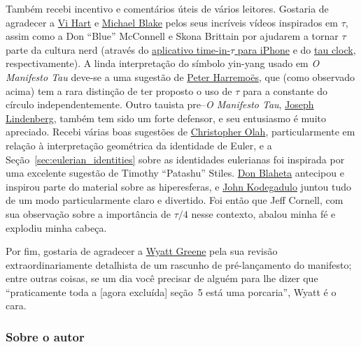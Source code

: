 Também recebi incentivo e comentários úteis de vários leitores. Gostaria de agradecer a \href{https://www.youtube.com/watch?v=jG7vhMMXagQ}{Vi Hart} e \href{https://www.youtube.com/watch?v=3174T-3-59Q}{Michael Blake} pelos seus incríveis vídeos inspirados em $\tau$, assim como a Don ``Blue'' McConnell e Skona Brittain por ajudarem a tornar $\tau$ parte da cultura nerd (através do \href{http://tauclock.com/}{aplicativo time-in-$\tau$ para iPhone} e do \href{http://www.sbcrafts.net/clocks/}{tau clock}, respectivamente). A linda interpretação do símbolo yin-yang usado em \emph{O Manifesto Tau} deve-se a uma sugestão de \href{http://www.harremoes.dk/Peter/}{Peter Harremo\"{e}s}, que (como observado acima) tem a rara distinção de ter proposto o uso de $\tau$ para a constante do círculo independentemente. Outro tauista pre--\emph{O Manifesto Tau}, \href{https://sites.google.com/site/taubeforeitwascool/}{Joseph Lindenberg}, também tem sido um forte defensor, e seu entusiasmo é muito apreciado. Recebi várias boas sugestões de \href{https://christopherolah.wordpress.com/about-me}{Christopher Olah}, particularmente em relação à interpretação geométrica da identidade de Euler, e a Seção~\ref{sec:eulerian_identities} sobre as identidades eulerianas foi inspirada por uma excelente sugestão de Timothy ``Patashu'' Stiles. \href{http://www.blahedo.org/blog/archives/001083.html}{Don Blaheta} antecipou e inspirou parte do material sobre as hiperesferas, e \href{http://spikedmath.com/forum/viewtopic.php?f=30&t=147\#p1577}{John Kodegadulo} juntou tudo de um modo particularmente claro e divertido. Foi então que Jeff Cornell, com sua observação sobre a importância de $\tau/4$ nesse contexto, abalou minha fé e explodiu minha cabeça.

Por fim, gostaria de agradecer a \href{https://techiferous.com/}{Wyatt Greene} pela sua revisão extraordinariamente detalhista de um rascunho de pré-lançamento do manifesto; entre outras coisas, se um dia você precisar de alguém para lhe dizer que ``praticamente toda a [agora excluída] seção~5 está uma porcaria'', Wyatt é o cara.


    \subsubsection{Sobre o autor} %
    \label{sec:about_the_author}



